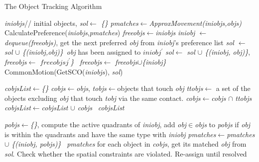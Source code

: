 \documentclass[letterpaper]{article}
\begin{document}
\begin{algorithm}[!]
\caption{The Object Tracking Algorithm}\label{algo}
\begin{algorithmic}[1]
\State \emph{iniobjs}// initial objects, \emph{sol$\leftarrow$ \{\}}
\State \emph{pmatches$\leftarrow$ApproxMovement(iniobjs,objs)} \label{SetPossible}
\State CalculatePreference(\emph{iniobjs},\emph{pmatches})\label{calPref}
\State \emph{freeobjs$\leftarrow$iniobjs}
\label{stableMarriage}
\State \emph{iniobj $\leftarrow$ dequeue(freeobjs)}, get the next preferred \emph{obj} from \emph{iniobj}'s preference list  
   \emph{sol $\leftarrow$ sol $\cup$ \{(iniobj,obj)\}}
  \Else\,\emph{obj} has been assigned to \emph{$iniobj^{\prime}$}
   \emph{sol$\leftarrow$ sol $\cup$ \{(iniobj, obj)\}}, \emph{freeobjs$\leftarrow$ $freeobjsj^{\prime}$\}}
  \Else\, 
   \emph{freeobjs$\leftarrow$ freeobjs$\cup$\{iniobj\}}
\EndIf 
\EndIf
\EndWhile
\State CommonMotion(GetSCO(\emph{iniobjs}), \emph{sol})
\EndProcedure

\label{getSCO}
\State \emph{cobjsList$\leftarrow$\{\}}
\State \emph{cobjs$\leftarrow$objs}, \emph{tobjs}$\leftarrow$objects that touch \emph{obj}
\State \emph{ttobjs}$\leftarrow$ a set of the objects excluding \emph{obj} that touch \emph{tobj} via the same contact.
\State \emph{cobjs}$\leftarrow$\emph{cobjs} $\cap$ \emph{ttobjs}
\EndFor
\State \emph{cobjsList}$\leftarrow$\emph{cobjsList $\cup$ cobjs}
\EndFor\,
\Return \emph{cobjsList}
\EndProcedure

\label{MA}
\State \emph{pobjs$\leftarrow$\{\}}, compute the active quadrants of \emph{iniobj}, add \emph{obj$\in$objs} to \emph{pobjs} if \emph{obj} is within the quadrants and have the same type with \emph{iniobj} 
\State \emph{pmatches$\leftarrow$pmatches $\cup$ \{(iniobj, pobjs)\}}
\EndFor\,
\Return \emph{pmatches}
\EndProcedure
{}\label{CommonMotion}
\State for each object in \emph{cobjs}, get its matched \emph{obj} from \emph{sol}. Check whether the spatial constraints are violated. Re-assign until resolved  
\EndFor
\EndProcedure
\end{algorithmic}
\end{algorithm}
\newpage



 
\end{document}
